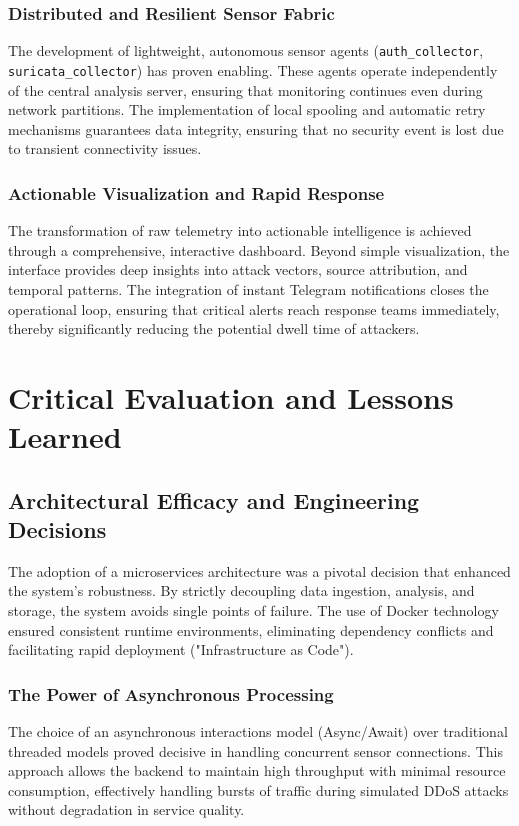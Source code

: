 \documentclass[12pt,a4paper]{report} %
\begin{document}
\subsubsection{Distributed and Resilient Sensor Fabric}
The development of lightweight, autonomous sensor agents (\texttt{auth\_collector}, \texttt{suricata\_collector}) has proven enabling. These agents operate independently of the central analysis server, ensuring that monitoring continues even during network partitions. The implementation of local spooling and automatic retry mechanisms guarantees data integrity, ensuring that no security event is lost due to transient connectivity issues.

\subsubsection{Actionable Visualization and Rapid Response}
The transformation of raw telemetry into actionable intelligence is achieved through a comprehensive, interactive dashboard. Beyond simple visualization, the interface provides deep insights into attack vectors, source attribution, and temporal patterns. The integration of instant Telegram notifications closes the operational loop, ensuring that critical alerts reach response teams immediately, thereby significantly reducing the potential dwell time of attackers.

\section{Critical Evaluation and Lessons Learned}

\subsection{Architectural Efficacy and Engineering Decisions}
The adoption of a microservices architecture was a pivotal decision that enhanced the system's robustness. By strictly decoupling data ingestion, analysis, and storage, the system avoids single points of failure. The use of Docker technology ensured consistent runtime environments, eliminating dependency conflicts and facilitating rapid deployment ("Infrastructure as Code").

\subsubsection{The Power of Asynchronous Processing}
The choice of an asynchronous interactions model (Async/Await) over traditional threaded models proved decisive in handling concurrent sensor connections. This approach allows the backend to maintain high throughput with minimal resource consumption, effectively handling bursts of traffic during simulated DDoS attacks without degradation in service quality.
\end{document}
